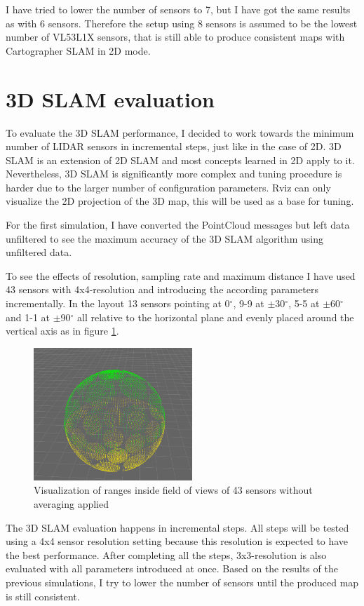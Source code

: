 I have tried to lower the number of sensors to 7, but I have got the same results as with 6 sensors.
Therefore the setup using 8 sensors is assumed to be the lowest number of VL53L1X sensors, that is still
able to produce consistent maps with Cartographer SLAM in 2D mode.


\newpage

\section{3D SLAM evaluation}
To evaluate the 3D SLAM performance, I decided to work towards the minimum number of LIDAR sensors in
incremental steps, just like in the case of 2D. 3D SLAM is an extension of 2D SLAM and most concepts learned
in 2D apply to it. Nevertheless, 3D SLAM is significantly more complex and tuning procedure is harder due
to the larger number of configuration parameters. Rviz can only visualize the 2D projection of the 3D
map, this will be used as a base for tuning.

For the first simulation, I have converted the PointCloud messages but left data unfiltered to see the
maximum accuracy of the 3D SLAM algorithm using unfiltered data.

To see the effects of resolution, sampling rate and maximum distance I have used 43 sensors with
4x4-resolution and introducing the according parameters incrementally. In the layout 13 sensors pointing
at 0$^{\circ}$, 9-9 at $\pm$30$^{\circ}$, 5-5 at $\pm$60$^{\circ}$ and 1-1 at $\pm$90$^{\circ}$ all
relative to the horizontal plane and evenly placed around the vertical axis as in figure \ref{fig:09_layout}.

\begin{figure}[!h]
    \centering
	\includegraphics[height=50mm, keepaspectratio]{figures/09_layout.png}
    \caption{Visualization of ranges inside field of views of 43 sensors without averaging applied}
    \label{fig:09_layout}
\end{figure}

The 3D SLAM evaluation happens in incremental steps. All steps will be tested using a 4x4 sensor resolution
setting because this resolution is expected to have the best performance. After completing all the steps,
3x3-resolution is also evaluated with all parameters introduced at once. Based on the results of the previous
simulations, I try to lower the number of sensors until the produced map is still consistent.




